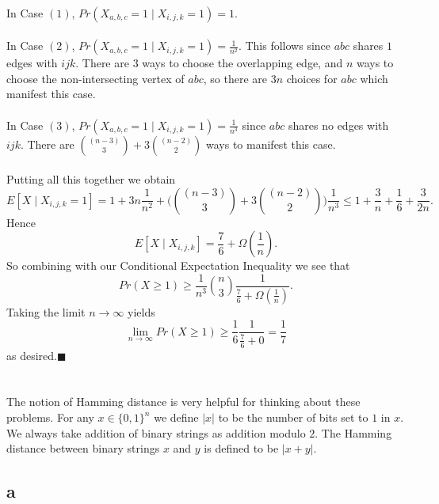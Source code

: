 \documentclass[letterpaper,12pt,oneside,onecolumn]{article}
\begin{document}
\paragraph{}
In Case $(1)$, $Pr(X_{a,b,c} =1 \mid X_{i,j,k} = 1) = 1$.
\paragraph{} 
In Case $(2)$, $Pr(X_{a,b,c} =1 \mid X_{i,j,k} = 1) = \frac{1}{n^2}.$ This follows since $abc$ shares $1$ edges with $ijk$. There are $3$ ways to choose the overlapping edge, and $n$ ways to choose the non-intersecting vertex of $abc$, so there are $3n$ choices for $abc$ which manifest this case.
\paragraph{}
In Case $(3)$, $Pr(X_{a,b,c} =1 \mid X_{i,j,k} = 1) = \frac{1}{n^3}$ since $abc$ shares no edges with $ijk$. There are ${(n-3) \choose 3} + 3{(n-2)\choose 2}$ ways to manifest this case.
\paragraph{}
Putting all this together we obtain
$$E[X \mid X_{i,j,k} = 1] = 1 + 3n\frac{1}{n^2} + \Bigg({(n-3) \choose 3} + 3{(n-2)\choose 2}\Bigg)\frac{1}{n^3} \leq 1 + \frac{3}{n} +  \frac{1}{6} + \frac{3}{2n}.$$
Hence 
$$E[X\mid X_{i,j,k}] = \frac{7}{6} + \Omega(\frac{1}{n}).$$
So combining with our Conditional Expectation Inequality we see that
$$Pr(X \geq 1) \geq \frac{1}{n^3}{n \choose 3}\frac{1}{\frac{7}{6} + \Omega(\frac{1}{n})}.$$
Taking the limit $n\rightarrow \infty$ yields
$$\lim_{n\rightarrow \infty} Pr(X \geq 1) \geq \frac{1}{6} \frac{1}{\frac{7}{6} + 0} = \frac{1}{7}$$
as desired.$\blacksquare$
\newpage
\section{}
\paragraph{}
The notion of Hamming distance is very helpful for thinking about these problems. For any $x \in \{0,1\}^n$ we define $|x|$ to be the number of bits set to $1$ in $x$. We always take addition of binary strings as addition modulo $2$. The Hamming distance between binary strings $x$ and $y$ is defined to be $|x+y|$.
\subsection{a}
\end{document}
